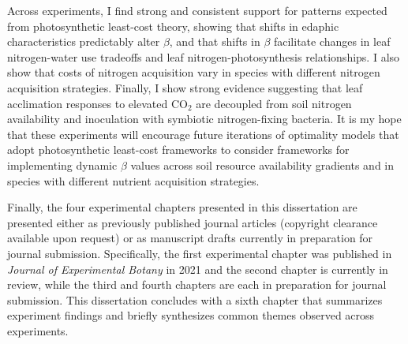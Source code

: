Across experiments, I find strong and consistent support for patterns expected from photosynthetic least-cost theory, showing that shifts in edaphic characteristics predictably alter $\beta$, and that shifts in $\beta$ facilitate changes in leaf nitrogen-water use tradeoffs and leaf nitrogen-photosynthesis relationships. I also show that costs of nitrogen acquisition vary in species with different nitrogen acquisition strategies. Finally, I show strong evidence suggesting that leaf acclimation responses to elevated CO$_2$ are decoupled from soil nitrogen availability and inoculation with symbiotic nitrogen-fixing bacteria. It is my hope that these experiments will encourage future iterations of optimality models that adopt photosynthetic least-cost frameworks to consider frameworks for implementing dynamic $\beta$ values across soil resource availability gradients and in species with different nutrient acquisition strategies.

Finally, the four experimental chapters presented in this dissertation are presented either as previously published journal articles (copyright clearance available upon request) or as manuscript drafts currently in preparation for journal submission. Specifically, the first experimental chapter was published in \textit{Journal of Experimental Botany} in 2021 and the second chapter is currently in review, while the third and fourth chapters are each in preparation for journal submission. This dissertation concludes with a sixth chapter that summarizes experiment findings and briefly synthesizes common themes observed across experiments.